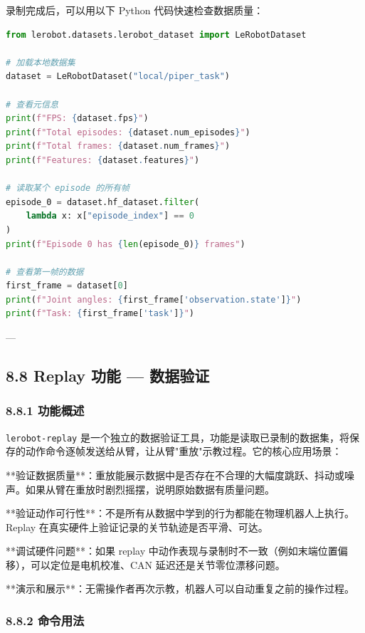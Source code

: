 \documentclass[UTF8,a4paper,11pt]{ctexart}
\begin{document}
{录制完成后，可以用以下 Python 代码快速检查数据质量：

\begin{lstlisting}[language=python]
from lerobot.datasets.lerobot_dataset import LeRobotDataset

# 加载本地数据集
dataset = LeRobotDataset("local/piper_task")

# 查看元信息
print(f"FPS: {dataset.fps}")
print(f"Total episodes: {dataset.num_episodes}")
print(f"Total frames: {dataset.num_frames}")
print(f"Features: {dataset.features}")

# 读取某个 episode 的所有帧
episode_0 = dataset.hf_dataset.filter(
    lambda x: x["episode_index"] == 0
)
print(f"Episode 0 has {len(episode_0)} frames")

# 查看第一帧的数据
first_frame = dataset[0]
print(f"Joint angles: {first_frame['observation.state']}")
print(f"Task: {first_frame['task']}")
\end{lstlisting}

---

\subsection{8.8 Replay 功能 — 数据验证}

\subsubsection{8.8.1 功能概述}

\texttt{lerobot-replay} 是一个独立的数据验证工具，功能是读取已录制的数据集，将保存的动作命令逐帧发送给从臂，让从臂"重放"示教过程。它的核心应用场景：

\item[1] **验证数据质量**：重放能展示数据中是否存在不合理的大幅度跳跃、抖动或噪声。如果从臂在重放时剧烈摇摆，说明原始数据有质量问题。
\item[2] **验证动作可行性**：不是所有从数据中学到的行为都能在物理机器人上执行。Replay 在真实硬件上验证记录的关节轨迹是否平滑、可达。
\item[3] **调试硬件问题**：如果 replay 中动作表现与录制时不一致（例如末端位置偏移），可以定位是电机校准、CAN 延迟还是关节零位漂移问题。
\item[4] **演示和展示**：无需操作者再次示教，机器人可以自动重复之前的操作过程。

\subsubsection{8.8.2 命令用法}

}
\end{document}
